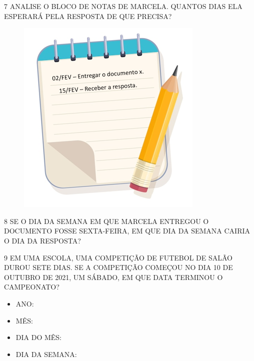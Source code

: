 
\num{7} ANALISE O BLOCO DE NOTAS DE MARCELA. QUANTOS DIAS ELA ESPERARÁ
PELA RESPOSTA DE QUE PRECISA?


\begin{figure}[htpb!]
\centering
\includegraphics[width=.5\textwidth]{media/image37.png}
\end{figure}


\num{8} SE O DIA DA SEMANA EM QUE MARCELA ENTREGOU O DOCUMENTO FOSSE
SEXTA-FEIRA, EM QUE DIA DA SEMANA CAIRIA O DIA DA RESPOSTA?


\num{9} EM UMA ESCOLA, UMA COMPETIÇÃO DE FUTEBOL DE SALÃO DUROU SETE DIAS.
SE A COMPETIÇÃO COMEÇOU NO DIA 10 DE OUTUBRO DE 2021, UM SÁBADO, EM QUE
DATA TERMINOU O CAMPEONATO?

\begin{itemize}
\item ANO: \reduline{2021\hfill}

\item MÊS: 

\item DIA DO MÊS: \reduline{16\hfill}

\item DIA DA SEMANA: 
\end{itemize}


